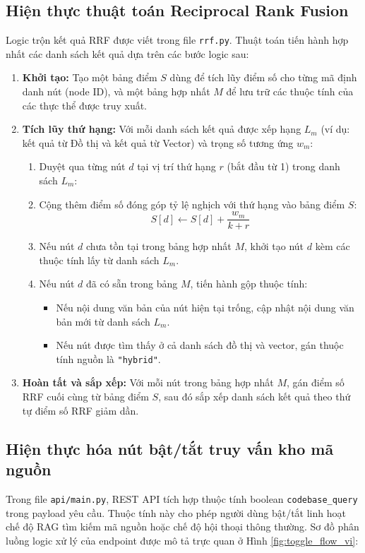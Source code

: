 \documentclass[12pt,a4paper,oneside]{report}
\begin{document}
\subsection{Hiện thực thuật toán Reciprocal Rank Fusion}
Logic trộn kết quả RRF được viết trong file \texttt{rrf.py}. Thuật toán tiến hành hợp nhất các danh sách kết quả dựa trên các bước logic sau:
\begin{enumerate}
    \item \textbf{Khởi tạo:} Tạo một bảng điểm $S$ dùng để tích lũy điểm số cho từng mã định danh nút (node ID), và một bảng hợp nhất $M$ để lưu trữ các thuộc tính của các thực thể được truy xuất.
    \item \textbf{Tích lũy thứ hạng:} Với mỗi danh sách kết quả được xếp hạng $L_m$ (ví dụ: kết quả từ Đồ thị và kết quả từ Vector) và trọng số tương ứng $w_m$:
    \begin{enumerate}
        \item Duyệt qua từng nút $d$ tại vị trí thứ hạng $r$ (bắt đầu từ 1) trong danh sách $L_m$:
        \item Cộng thêm điểm số đóng góp tỷ lệ nghịch với thứ hạng vào bảng điểm $S$:
        $$S[d] \leftarrow S[d] + \frac{w_m}{k + r}$$
        \item Nếu nút $d$ chưa tồn tại trong bảng hợp nhất $M$, khởi tạo nút $d$ kèm các thuộc tính lấy từ danh sách $L_m$.
        \item Nếu nút $d$ đã có sẵn trong bảng $M$, tiến hành gộp thuộc tính:
        \begin{itemize}
            \item Nếu nội dung văn bản của nút hiện tại trống, cập nhật nội dung văn bản mới từ danh sách $L_m$.
            \item Nếu nút được tìm thấy ở cả danh sách đồ thị và vector, gán thuộc tính nguồn là \texttt{"hybrid"}.
        \end{itemize}
    \end{enumerate}
    \item \textbf{Hoàn tất và sắp xếp:} Với mỗi nút trong bảng hợp nhất $M$, gán điểm số RRF cuối cùng từ bảng điểm $S$, sau đó sắp xếp danh sách kết quả theo thứ tự điểm số RRF giảm dần.
\end{enumerate}

\subsection{Hiện thực hóa nút bật/tắt truy vấn kho mã nguồn}
Trong file \texttt{api/main.py}, REST API tích hợp thuộc tính boolean \texttt{codebase\_query} trong payload yêu cầu. Thuộc tính này cho phép người dùng bật/tắt linh hoạt chế độ RAG tìm kiếm mã nguồn hoặc chế độ hội thoại thông thường. Sơ đồ phân luồng logic xử lý của endpoint được mô tả trực quan ở Hình \ref{fig:toggle_flow_vi}:
\end{document}
